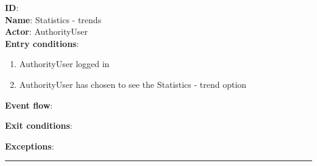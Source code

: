     \textbf{ID}:  \\
    \textbf{Name}: Statistics - trends \\
    \textbf{Actor}: AuthorityUser   \\
    \textbf{Entry conditions}:
    \begin{enumerate}
      \item{AuthorityUser logged in}
      \item{AuthorityUser has chosen to see the Statistics - trend option}
    \end{enumerate}
    \textbf{Event flow}:
    \begin{enumerate}
      \item {
      \item
    \end{enumerate}
    \textbf{Exit conditions}:
    \begin{enumerate}

    \end{enumerate}
    \textbf{Exceptions}:
    \begin{enumerate}
    \end{enumerate}
    \rule{\linewidth}{0.4pt}
